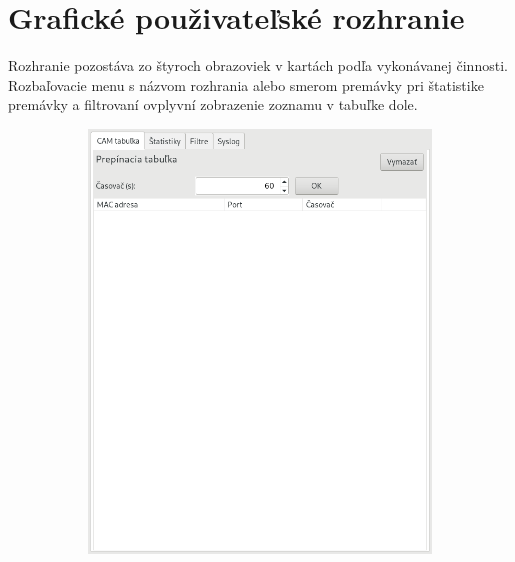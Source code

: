 \documentclass[12pt, a4paper]{article}
\begin{document}
\section{Grafické použivateľské rozhranie}
Rozhranie pozostáva zo štyroch obrazoviek v kartách podľa vykonávanej činnosti. Rozbaľovacie menu s názvom rozhrania alebo
smerom premávky pri štatistike premávky a filtrovaní ovplyvní zobrazenie zoznamu v tabuľke dole.
\begin{figure}[h!]
\centering
\begin{subfigure}{0.45\textwidth}
	\centering
	\includegraphics[width=\textwidth]{assets/cam.png}
\end{subfigure}
\hfill
\begin{subfigure}{0.45\textwidth}
	\centering

\end{subfigure}
\end{figure}
\end{document}

